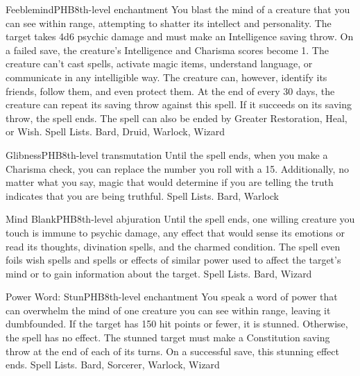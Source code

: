 \begin{spell}{Feeblemind}{PHB}{8th-level enchantment}
{
}
You blast the mind of a creature that you can see within range, attempting to shatter its intellect and personality. The target takes 4d6 psychic damage and must make an Intelligence saving throw.
On a failed save, the creature’s Intelligence and Charisma scores become 1. The creature can’t cast spells, activate magic items, understand language, or communicate in any intelligible way. The creature can, however, identify its friends, follow them, and even protect them.
At the end of every 30 days, the creature can repeat its saving throw against this spell. If it succeeds on its saving throw, the spell ends. The spell can also be ended by Greater Restoration, Heal, or Wish.
Spell Lists. Bard, Druid, Warlock, Wizard
\end{spell}

\begin{spell}{Glibness}{PHB}{8th-level transmutation}
{
}
Until the spell ends, when you make a Charisma check, you can replace the number you roll with a 15. Additionally, no matter what you say, magic that would determine if you are telling the truth indicates that you are being truthful.
Spell Lists. Bard, Warlock
\end{spell}

\begin{spell}{Mind Blank}{PHB}{8th-level abjuration}
{
}
Until the spell ends, one willing creature you touch is immune to psychic damage, any effect that would sense its emotions or read its thoughts, divination spells, and the charmed condition. The spell even foils wish spells and spells or effects of similar power used to affect the target's mind or to gain information about the target.
Spell Lists. Bard, Wizard
\end{spell}

\begin{spell}{Power Word: Stun}{PHB}{8th-level enchantment}
{
}
You speak a word of power that can overwhelm the mind of one creature you can see within range, leaving it dumbfounded. If the target has 150 hit points or fewer, it is stunned. Otherwise, the spell has no effect. The stunned target must make a Constitution saving throw at the end of each of its turns. On a successful save, this stunning effect ends.
Spell Lists. Bard, Sorcerer, Warlock, Wizard
\end{spell}

